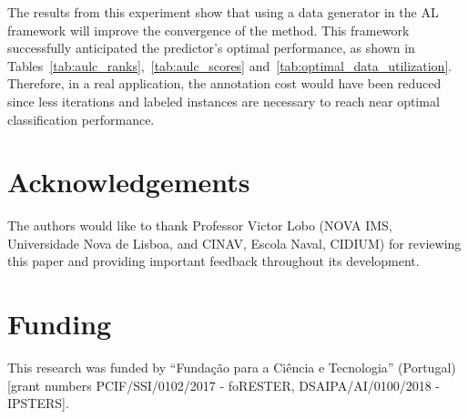 \documentclass[preprint,12pt]{elsarticle}
\begin{document}
The results from this experiment show that using a data generator in the AL
framework will improve the convergence of the method. This framework
successfully anticipated the predictor's optimal performance, as shown in
Tables~\ref{tab:aulc_ranks},~\ref{tab:aulc_scores}
and~\ref{tab:optimal_data_utilization}. Therefore, in a real application, the
annotation cost would have been reduced since less iterations and labeled
instances are necessary to reach near optimal classification performance.

\section{Acknowledgements}

The authors would like to thank Professor Victor Lobo (NOVA IMS, Universidade
Nova de Lisboa, and CINAV, Escola Naval, CIDIUM) for reviewing this paper and
providing important feedback throughout its development.

\section{Funding}

This research was funded by ``Fundação para a Ciência e Tecnologia''
(Portugal) [grant numbers PCIF/SSI/0102/2017 - foRESTER, DSAIPA/AI/0100/2018 -
IPSTERS].



\end{document}
